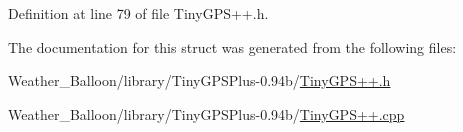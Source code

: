 Definition at line 79 of file Tiny\+G\+P\+S++.\+h.



The documentation for this struct was generated from the following files\+:\begin{DoxyCompactItemize}
\item 
Weather\+\_\+\+Balloon/library/\+Tiny\+G\+P\+S\+Plus-\/0.\+94b/\hyperlink{_tiny_g_p_s_09_09_8h}{Tiny\+G\+P\+S++.\+h}\item 
Weather\+\_\+\+Balloon/library/\+Tiny\+G\+P\+S\+Plus-\/0.\+94b/\hyperlink{_tiny_g_p_s_09_09_8cpp}{Tiny\+G\+P\+S++.\+cpp}\end{DoxyCompactItemize}
